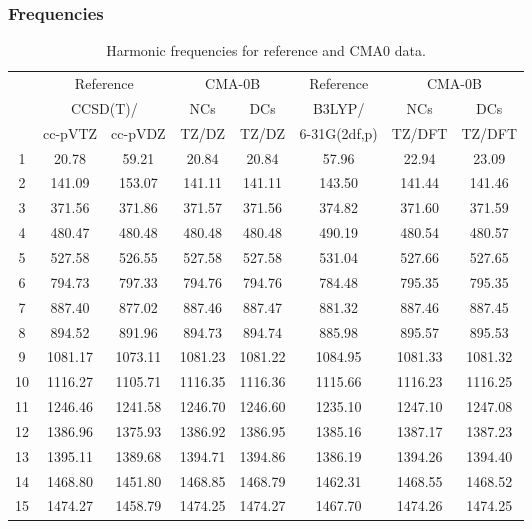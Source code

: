 \documentclass[10pt,oneside]{article}
\begin{document}
\subsubsection*{Frequencies}
\begin{table}[h!]
\centering
\caption{Harmonic frequencies for reference and CMA0 data.}
\begin{tabular}{cccccccc}
\toprule
{} & \multicolumn{2}{c}{Reference} & \multicolumn{2}{c}{CMA-0B} &    Reference & \multicolumn{2}{c}{CMA-0B} \\
{} & \multicolumn{2}{c}{CCSD(T)/} &     NCs &     DCs &       B3LYP/ &     NCs &     DCs \\
{} &   cc-pVTZ & cc-pVDZ &   TZ/DZ &   TZ/DZ & 6-31G(2df,p) &  TZ/DFT &  TZ/DFT \\
\midrule
1  &     20.78 &   59.21 &   20.84 &   20.84 &        57.96 &   22.94 &   23.09 \\
2  &    141.09 &  153.07 &  141.11 &  141.11 &       143.50 &  141.44 &  141.46 \\
3  &    371.56 &  371.86 &  371.57 &  371.56 &       374.82 &  371.60 &  371.59 \\
4  &    480.47 &  480.48 &  480.48 &  480.48 &       490.19 &  480.54 &  480.57 \\
5  &    527.58 &  526.55 &  527.58 &  527.58 &       531.04 &  527.66 &  527.65 \\
6  &    794.73 &  797.33 &  794.76 &  794.76 &       784.48 &  795.35 &  795.35 \\
7  &    887.40 &  877.02 &  887.46 &  887.47 &       881.32 &  887.46 &  887.45 \\
8  &    894.52 &  891.96 &  894.73 &  894.74 &       885.98 &  895.57 &  895.53 \\
9  &   1081.17 & 1073.11 & 1081.23 & 1081.22 &      1084.95 & 1081.33 & 1081.32 \\
10 &   1116.27 & 1105.71 & 1116.35 & 1116.36 &      1115.66 & 1116.23 & 1116.25 \\
11 &   1246.46 & 1241.58 & 1246.70 & 1246.60 &      1235.10 & 1247.10 & 1247.08 \\
12 &   1386.96 & 1375.93 & 1386.92 & 1386.95 &      1385.16 & 1387.17 & 1387.23 \\
13 &   1395.11 & 1389.68 & 1394.71 & 1394.86 &      1386.19 & 1394.26 & 1394.40 \\
14 &   1468.80 & 1451.80 & 1468.85 & 1468.79 &      1462.31 & 1468.55 & 1468.52 \\
15 &   1474.27 & 1458.79 & 1474.25 & 1474.27 &      1467.70 & 1474.26 & 1474.25 \\

\end{tabular}
\end{table}
\end{document}
